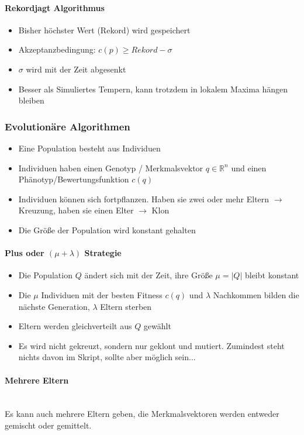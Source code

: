 \paragraph{Rekordjagt Algorithmus}
\begin{itemize}
	\item Bisher höchster Wert (Rekord) wird gespeichert
	\item Akzeptanzbedingung: \(c(p) \geq Rekord - \sigma\)
	\item \(\sigma\) wird mit der Zeit abgesenkt
	\item Besser als Simuliertes Tempern, kann trotzdem in lokalem Maxima hängen bleiben
\end{itemize}

\subsubsection{Evolutionäre Algorithmen}
\begin{itemize}
	\item Eine Population besteht aus Individuen
	\item Individuen haben einen Genotyp / Merkmalsvektor \(q \in \mathbb{R}^n\) und einen Phänotyp/Bewertungsfunktion \(c(q)\)
	\item Individuen können sich fortpflanzen. Haben sie zwei oder mehr Eltern $\rightarrow$ Kreuzung, haben sie einen Elter $\rightarrow$ Klon
	\item Die Größe der Population wird konstant gehalten
\end{itemize}

\paragraph{Plus oder $(\mu + \lambda)$ Strategie}
\begin{itemize}
	\item Die Population \(Q\) ändert sich mit der Zeit, ihre Größe \(\mu = |Q|\) bleibt konstant
	\item Die \(\mu\) Individuen mit der besten Fitness \(c(q)\) und \(\lambda\) Nachkommen bilden die nächste Generation, \(\lambda\) Eltern sterben
	\item Eltern werden gleichverteilt aus \(Q\) gewählt
	\item Es wird nicht gekreuzt, sondern nur geklont und mutiert. Zumindest steht nichts davon im Skript, sollte aber möglich sein...
\end{itemize}

\paragraph{Mehrere Eltern}
\text{ }\\Es kann auch mehrere Eltern geben, die Merkmalsvektoren werden entweder gemischt oder gemittelt.


